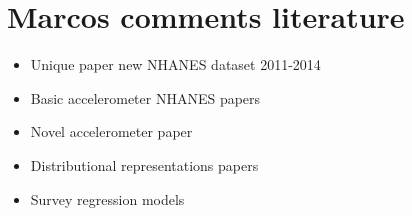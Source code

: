 \documentclass{article}
\begin{document}
\section{Marcos comments literature}

\begin{itemize}
    \item  Unique paper new NHANES dataset 2011-2014 \cite{00005768-202111000-00026} 
    \item  Basic accelerometer NHANES papers \cite{leroux2019organizing}
    
    \item  Novel accelerometer paper \cite{LeGoallec2021.06.21.21259265}
    
    \item Distributional representations papers \cite{matabuena2021distributional,ghosal2021scalar,ghosal2021distributional}
    
    \item Survey regression models
    
    \cite{10.1214/16-STS605}
    
\end{itemize}

 



\end{document}
